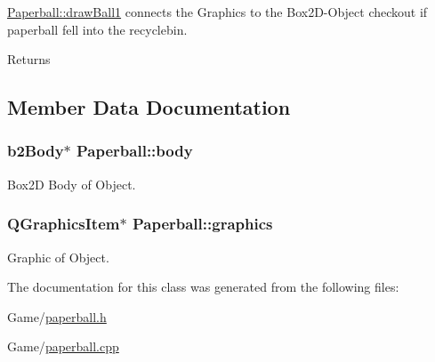 \hyperlink{class_paperball_a3bb15d3327d35c3408fe7e5b06bce078}{Paperball\+::draw\+Ball1} connects the Graphics to the Box2\+D-\/\+Object checkout if paperball fell into the recyclebin. 

\begin{DoxyReturn}{Returns}

\end{DoxyReturn}


\subsection{Member Data Documentation}
\subsubsection[{\texorpdfstring{body}{body}}]{\setlength{\rightskip}{0pt plus 5cm}b2\+Body$\ast$ Paperball\+::body}\hypertarget{class_paperball_a5d5b3e0d4237ba80fe9590f49c88a0c0}{}\label{class_paperball_a5d5b3e0d4237ba80fe9590f49c88a0c0}


Box2D Body of Object. 

\subsubsection[{\texorpdfstring{graphics}{graphics}}]{\setlength{\rightskip}{0pt plus 5cm}Q\+Graphics\+Item$\ast$ Paperball\+::graphics}\hypertarget{class_paperball_a87b4515e298699c840f541ee637215dd}{}\label{class_paperball_a87b4515e298699c840f541ee637215dd}


Graphic of Object. 



The documentation for this class was generated from the following files\+:\begin{DoxyCompactItemize}
\item 
Game/\hyperlink{paperball_8h}{paperball.\+h}\item 
Game/\hyperlink{paperball_8cpp}{paperball.\+cpp}\end{DoxyCompactItemize}
